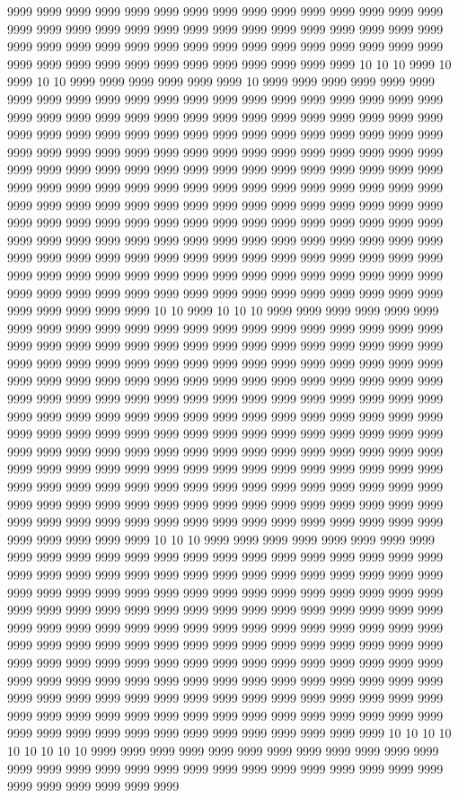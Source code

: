 9999 9999 9999 9999 9999 9999 9999 9999 9999 9999 9999 9999 9999 9999 9999 9999 9999 9999 9999 9999 9999 9999 9999 9999 9999 9999 9999 9999 9999 9999 9999 9999 9999 9999 9999 9999 9999 9999 9999 9999 9999 9999 9999 9999 9999 9999 9999 9999 9999 9999 9999 9999 9999 9999 9999 9999 9999 10 10 10 9999 10 9999 10 10 9999 9999 9999 9999 9999 9999 10 9999 9999 9999 9999 9999 9999 9999 9999 9999 9999 9999 9999 9999 9999 9999 9999 9999 9999 9999 9999 9999 9999 9999 9999 9999 9999 9999 9999 9999 9999 9999 9999 9999 9999 9999 9999 9999 9999 9999 9999 9999 9999 9999 9999 9999 9999 9999 9999 9999 9999 9999 9999 9999 9999 9999 9999 9999 9999 9999 9999 9999 9999 9999 9999 9999 9999 9999 9999 9999 9999 9999 9999 9999 9999 9999 9999 9999 9999 9999 9999 9999 9999 9999 9999 9999 9999 9999 9999 9999 9999 9999 9999 9999 9999 9999 9999 9999 9999 9999 9999 9999 9999 9999 9999 9999 9999 9999 9999 9999 9999 9999 9999 9999 9999 9999 9999 9999 9999 9999 9999 9999 9999 9999 9999 9999 9999 9999 9999 9999 9999 9999 9999 9999 9999 9999 9999 9999 9999 9999 9999 9999 9999 9999 9999 9999 9999 9999 9999 9999 9999 9999 9999 9999 9999 9999 9999 9999 9999 9999 9999 9999 9999 9999 9999 9999 9999 9999 9999 9999 9999 9999 9999 9999 9999 9999 9999 9999 9999 9999 9999 9999 9999 9999 9999 9999 9999 9999 9999 9999 9999 9999 10 10 9999 10 10 10 9999 9999 9999 9999 9999 9999 9999 9999 9999 9999 9999 9999 9999 9999 9999 9999 9999 9999 9999 9999 9999 9999 9999 9999 9999 9999 9999 9999 9999 9999 9999 9999 9999 9999 9999 9999 9999 9999 9999 9999 9999 9999 9999 9999 9999 9999 9999 9999 9999 9999 9999 9999 9999 9999 9999 9999 9999 9999 9999 9999 9999 9999 9999 9999 9999 9999 9999 9999 9999 9999 9999 9999 9999 9999 9999 9999 9999 9999 9999 9999 9999 9999 9999 9999 9999 9999 9999 9999 9999 9999 9999 9999 9999 9999 9999 9999 9999 9999 9999 9999 9999 9999 9999 9999 9999 9999 9999 9999 9999 9999 9999 9999 9999 9999 9999 9999 9999 9999 9999 9999 9999 9999 9999 9999 9999 9999 9999 9999 9999 9999 9999 9999 9999 9999 9999 9999 9999 9999 9999 9999 9999 9999 9999 9999 9999 9999 9999 9999 9999 9999 9999 9999 9999 9999 9999 9999 9999 9999 9999 9999 9999 9999 9999 9999 9999 9999 9999 9999 9999 9999 9999 9999 9999 9999 9999 9999 9999 9999 9999 9999 9999 9999 9999 9999 9999 9999 9999 9999 9999 9999 9999 10 10 10 9999 9999 9999 9999 9999 9999 9999 9999 9999 9999 9999 9999 9999 9999 9999 9999 9999 9999 9999 9999 9999 9999 9999 9999 9999 9999 9999 9999 9999 9999 9999 9999 9999 9999 9999 9999 9999 9999 9999 9999 9999 9999 9999 9999 9999 9999 9999 9999 9999 9999 9999 9999 9999 9999 9999 9999 9999 9999 9999 9999 9999 9999 9999 9999 9999 9999 9999 9999 9999 9999 9999 9999 9999 9999 9999 9999 9999 9999 9999 9999 9999 9999 9999 9999 9999 9999 9999 9999 9999 9999 9999 9999 9999 9999 9999 9999 9999 9999 9999 9999 9999 9999 9999 9999 9999 9999 9999 9999 9999 9999 9999 9999 9999 9999 9999 9999 9999 9999 9999 9999 9999 9999 9999 9999 9999 9999 9999 9999 9999 9999 9999 9999 9999 9999 9999 9999 9999 9999 9999 9999 9999 9999 9999 9999 9999 9999 9999 9999 9999 9999 9999 9999 9999 9999 9999 9999 9999 9999 9999 9999 9999 9999 9999 9999 9999 9999 9999 9999 9999 9999 9999 10 10 10 10 10 10 10 10 10 9999 9999 9999 9999 9999 9999 9999 9999 9999 9999 9999 9999 9999 9999 9999 9999 9999 9999 9999 9999 9999 9999 9999 9999 9999 9999 9999 9999 9999 9999 9999 9999 9999 